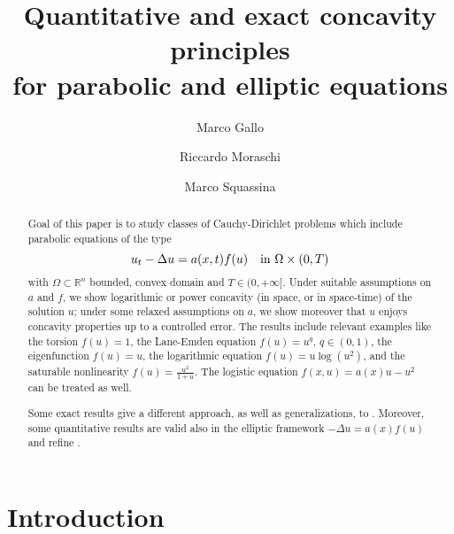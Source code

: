\documentclass[11pt, reqno]{amsart}
\title[Quantitative and exact concavity principles for parabolic and elliptic equations]
{Quantitative and exact concavity principles \\ for parabolic and elliptic equations}
\author[M. Gallo]{Marco Gallo \orcidlink{0000-0002-3141-9598}}
\author[R. Moraschi]{Riccardo Moraschi \orcidlink{0009-0001-6049-5362}}
\author[M. Squassina]{Marco Squassina \orcidlink{0000-0003-0858-4648}}
\theoremstyle{definition}
\numberwithin{equation}{section}
\begin{document}
\begin{abstract}%
Goal of this paper is to study classes of Cauchy-Dirichlet problems which include parabolic equations of the type
$$u_t -\Delta u= a(x,t)f(u)\quad\hbox{in $\Omega\times(0,T)$}$$
with $\Omega\subset\mathbb{R}^n$ bounded, convex domain and $T\in(0,+\infty]$. 
Under suitable assumptions on $a$ and $f$, we show logarithmic or power concavity (in space, or in space-time) of the solution $u$; under some relaxed assumptions on $a$, we show moreover that $u$ enjoys concavity properties up to a controlled error. 
The results include relevant examples like the torsion $f(u)=1$, the Lane-Emden equation $f(u)=u^q$, $q\in(0,1)$, the eigenfunction $f(u)=u$, the logarithmic equation $f(u)=u\log(u^2)$, and the saturable nonlinearity $f(u)=\frac{u^2}{1+u}$. 
The logistic equation $f(x,u)=a(x)u-u^2$ can be treated as well.

Some exact results give a different approach, as well as generalizations, to \cite{IsSa13, IsSa16}. 
Moreover, some quantitative results are valid also in the elliptic framework $-\Delta u=a(x)f(u)$ and refine \cite{BuSq19, GaSq24}.
\end{abstract}


\maketitle

\vspace{-1em}

\begin{center}
\begin{minipage}{10cm}
		\small
		\tableofcontents
\end{minipage}
\end{center}

\vspace{1em}


\section{Introduction}
\end{document}
